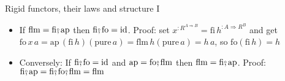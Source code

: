 \documentclass[english]{beamer}
\newcommand{\bef}{\ensuremath\raisebox{2pt}{$\mathsmaller{\mathsmaller{\circ}}$}\hspace{-3.3pt},}
\begin{document}
\begin{frame}{Rigid functors, their laws and structure I}
\begin{itemize}
\begin{itemize}
\item {\small{}$\text{ap}:R^{A\Rightarrow B}\Rightarrow R^{A}\Rightarrow R^{B}$}{\small\par}
\item The connection is {\small{}$\text{flm}=\text{fi}\bef\text{ap}$} and
{\small{}$\text{ap}=\text{fo}\bef\text{flm}$} 
\begin{itemize}
\item However, here we need to flip the order of $R$-effects in \texttt{\textcolor{blue}{\footnotesize{}ap}} 
\end{itemize}
\item Connection between $\text{ap}$ and $\text{fo}$ is $\text{fo}\,x\,a=\text{ap}\,x\,\left(\text{pure}\,a\right)$
\end{itemize}
\item If {\small{}$\text{flm}=\text{fi}\bef\text{ap}$} then $\text{fi}\bef\text{fo}=\text{id}$.
Proof: set $x^{:R^{A\Rightarrow B}}=\text{fi}\,h^{:A\Rightarrow R^{B}}$
and get $\text{fo}\,x\,a=\text{ap}\,\left(\text{fi}\,h\right)\left(\text{pure}\,a\right)=\text{flm}\,h\left(\text{pure}\,a\right)=h\,a$,
so $\text{fo}\left(\text{fi}\,h\right)=h$ 
\item Conversely: If $\text{fi}\bef\text{fo}=\text{id}$ and {\small{}$\text{ap}=\text{fo}\bef\text{flm}$}
then {\small{}$\text{flm}=\text{fi}\bef\text{ap}$. Proof: $\text{fi}\bef\text{ap}=\text{fi}\bef\text{fo}\bef\text{flm}=\text{flm}$} 
\end{itemize}
\end{frame}
\end{document}
